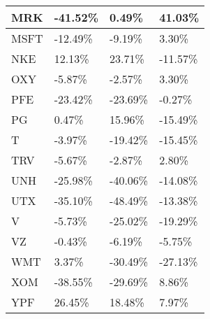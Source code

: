 \begin{table}
\begin{tabular}{ | p{2cm\textwidth} | p{3.5cm\textwidth} | p{3.5cm\textwidth} | p{3.5cm\textwidth} | }
MRK     & -41.52\%           & 0.49\%              & 41.03\%  \\\hline
MSFT    & -12.49\%           & -9.19\%             & 3.30\%   \\\hline
NKE     & 12.13\%            & 23.71\%             & -11.57\% \\\hline
OXY     & -5.87\%            & -2.57\%             & 3.30\%   \\\hline
PFE     & -23.42\%           & -23.69\%            & -0.27\%  \\\hline
PG      & 0.47\%             & 15.96\%             & -15.49\% \\\hline
T       & -3.97\%            & -19.42\%            & -15.45\% \\\hline
TRV     & -5.67\%            & -2.87\%             & 2.80\%   \\\hline
UNH     & -25.98\%           & -40.06\%            & -14.08\% \\\hline
UTX     & -35.10\%           & -48.49\%            & -13.38\% \\\hline
V       & -5.73\%            & -25.02\%            & -19.29\% \\\hline
VZ      & -0.43\%            & -6.19\%             & -5.75\%  \\\hline
WMT     & 3.37\%             & -30.49\%            & -27.13\% \\\hline
XOM     & -38.55\%           & -29.69\%            & 8.86\%   \\\hline
YPF     & 26.45\%            & 18.48\%             & 7.97\%  \\\hline

    \end{tabular}
\end{table}



